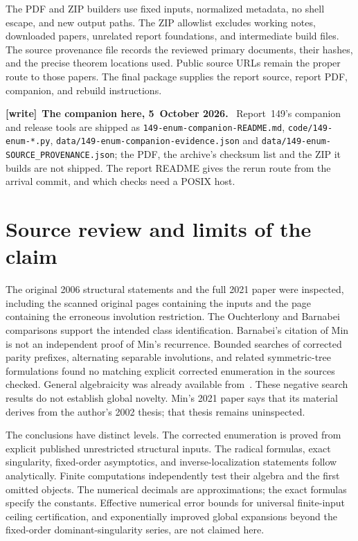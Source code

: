 \documentclass[11pt,letterpaper]{article}
\numberwithin{equation}{section}
\theoremstyle{remark}\newtheorem{remark}[theorem]{Remark}
\newcommand{\file}[1]{\nolinkurl{#1}}
\newenvironment{writenote}[1][]{\par\smallskip\begingroup\small
 \noindent\textbf{[write]}\if\relax\detokenize{#1}\relax\else~\textbf{#1.}\fi\ }%
 {\par\endgroup\smallskip}
\begin{document}
The PDF and ZIP builders use fixed inputs, normalized metadata,
no shell escape, and new output paths. The ZIP allowlist excludes
working notes, downloaded papers, unrelated report foundations, and
intermediate build files. The source provenance file records the
reviewed primary documents, their hashes, and the precise theorem
locations used. Public source URLs remain the proper route to those
papers. The final package supplies the report source, report PDF,
companion, and rebuild instructions.

\begin{writenote}[The companion here, 5~October 2026]
Report~149's companion and release tools are shipped as \file{149-enum-companion-README.md}, \file{code/149-enum-*.py}, \file{data/149-enum-companion-evidence.json} and \file{data/149-enum-SOURCE_PROVENANCE.json}; the PDF, the archive's checksum list and the ZIP it builds are not shipped. The report README gives the rerun route from the arrival commit, and which checks need a POSIX host.
\end{writenote}

\section{Source review and limits of the claim}\label{abx:en:sec:sources}
The original 2006 structural statements and the full 2021 paper were
inspected, including the scanned original pages containing the inputs
and the page containing the erroneous involution restriction. The
Ouchterlony and Barnabei comparisons support the intended class
identification. Barnabei's citation of Min is not an independent proof
of Min's recurrence. Bounded searches of corrected parity prefixes, alternating separable
involutions, and related symmetric-tree formulations found no matching
explicit corrected enumeration in the sources checked. General
algebraicity was already available from~\cite{BHV}. These negative
search results do not establish global novelty.
Min's 2021 paper says that its material derives from the author's 2002
thesis; that thesis remains uninspected.

The conclusions have distinct levels. The corrected enumeration is
proved from explicit published unrestricted structural inputs. The
radical formulas, exact singularity, fixed-order asymptotics, and
inverse-localization statements follow analytically. Finite
computations independently test their algebra and the first omitted
objects. The numerical decimals are approximations; the exact formulas
specify the constants. Effective numerical error bounds for universal
finite-input ceiling certification, and exponentially improved global
expansions beyond the fixed-order dominant-singularity series, are not
claimed here.
\end{document}

